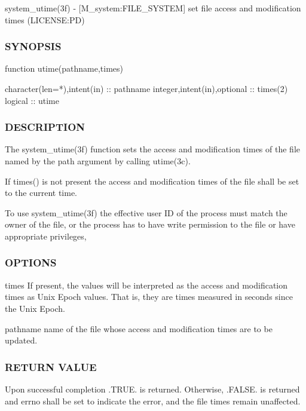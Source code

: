 system\+\_\+utime(3f) -\/ \mbox{[}M\+\_\+system\+:F\+I\+L\+E\+\_\+\+S\+Y\+S\+T\+EM\mbox{]} set file access and modification times (L\+I\+C\+E\+N\+SE\+:PD) 

\subsubsection*{S\+Y\+N\+O\+P\+S\+IS}

\begin{DoxyVerb}    function utime(pathname,times)

     character(len=*),intent(in) :: pathname
     integer,intent(in),optional :: times(2)
     logical                     :: utime
\end{DoxyVerb}


\subsubsection*{D\+E\+S\+C\+R\+I\+P\+T\+I\+ON}

The system\+\_\+utime(3f) function sets the access and modification times of the file named by the path argument by calling utime(3c).

If times() is not present the access and modification times of the file shall be set to the current time.

To use system\+\_\+utime(3f) the effective user ID of the process must match the owner of the file, or the process has to have write permission to the file or have appropriate privileges,

\subsubsection*{O\+P\+T\+I\+O\+NS}

times If present, the values will be interpreted as the access and modification times as Unix Epoch values. That is, they are times measured in seconds since the Unix Epoch.

pathname name of the file whose access and modification times are to be updated.

\subsubsection*{R\+E\+T\+U\+RN V\+A\+L\+UE}

Upon successful completion .T\+R\+UE. is returned. Otherwise, .F\+A\+L\+SE. is returned and errno shall be set to indicate the error, and the file times remain unaffected.

